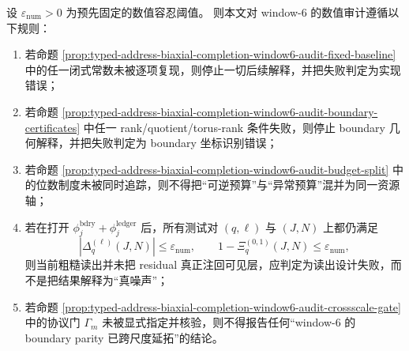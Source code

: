 \begin{proposition}\label{prop:typed-address-biaxial-completion-window6-audit-pass-fail-rules}
设 \(\varepsilon_{\mathrm{num}}>0\) 为预先固定的数值容忍阈值。
则本文对 window-\(6\) 的数值审计遵循以下规则：
\begin{enumerate}
  \item 若命题 \ref{prop:typed-address-biaxial-completion-window6-audit-fixed-baseline} 中的任一闭式常数未被逐项复现，则停止一切后续解释，并把失败判定为实现错误；
  \item 若命题 \ref{prop:typed-address-biaxial-completion-window6-audit-boundary-certificates} 中任一 rank/quotient/torus-rank 条件失败，则停止 boundary 几何解释，并把失败判定为 boundary 坐标识别错误；
  \item 若命题 \ref{prop:typed-address-biaxial-completion-window6-audit-budget-split} 中的位数制度未被同时追踪，则不得把“可逆预算”与“异常预算”混并为同一资源轴；
  \item 若在打开 \(\phi_j^{\mathrm{bdry}}+\phi_j^{\mathrm{ledger}}\) 后，所有测试对 \((q,\ell)\) 与 \((J,N)\) 上都仍满足
  \[
  |\Delta_q^{(\ell)}(J,N)|\le \varepsilon_{\mathrm{num}},
  \qquad
  1-\Xi_q^{(0,1)}(J,N)\le \varepsilon_{\mathrm{num}},
  \]
  则当前粗糙读出并未把 residual 真正注回可见层，应判定为读出设计失败，而不是把结果解释为“真噪声”；
  \item 若命题 \ref{prop:typed-address-biaxial-completion-window6-audit-crossscale-gate} 中的协议门 \(\Gamma_m\) 未被显式指定并核验，则不得报告任何“window-\(6\) 的 boundary parity 已跨尺度延拓”的结论。
\end{enumerate}
\end{proposition}


